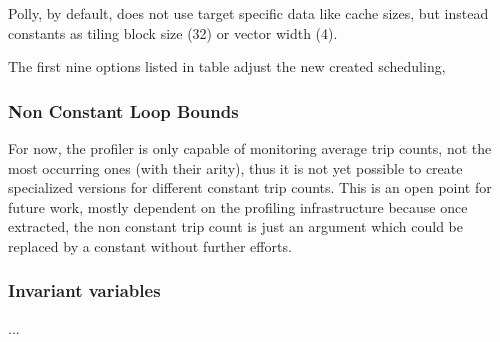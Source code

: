 
Polly, by default, does not use target specific data like cache 
sizes, but instead constants as tiling block size (32) or vector width (4).  


The first nine options listed in table  adjust the new 
created scheduling, 



\subsubsection{Non Constant Loop Bounds}
For now, the profiler is only capable of monitoring average trip counts,
not the most occurring ones (with their arity), thus it is not yet possible to 
create specialized versions for different constant trip counts.
This is an open point for future work, 
mostly dependent on the profiling infrastructure because once extracted, the 
non constant trip count is just an argument which could be replaced by a constant
without further efforts. 

\subsubsection{Invariant variables}
...
